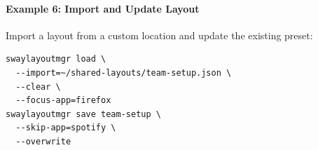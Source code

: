 \paragraph{Example 6: Import and Update Layout}
Import a layout from a custom location and update the existing preset:
\begin{verbatim}
swaylayoutmgr load \
  --import=~/shared-layouts/team-setup.json \
  --clear \
  --focus-app=firefox
swaylayoutmgr save team-setup \
  --skip-app=spotify \
  --overwrite
\end{verbatim}